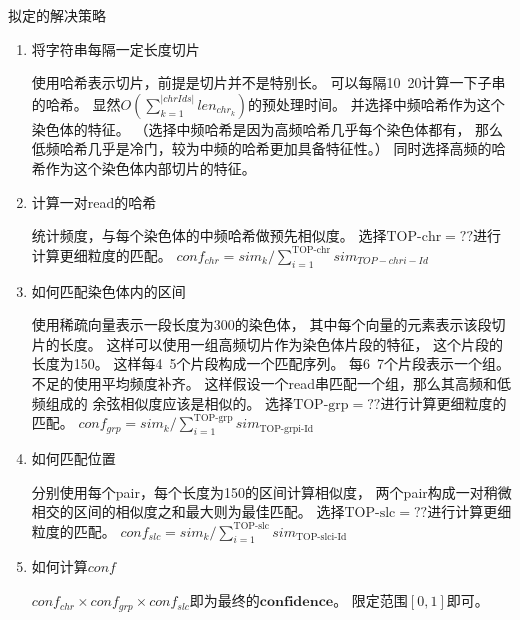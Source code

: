 \documentclass[hyperref,UTF8]{ctexart}
\theoremstyle{definition}
\theoremstyle{remark}
\numberwithin{equation}{subsection}
\newcommand{\Emph}{\textbf}
\begin{document}
	拟定的解决策略
	\begin{enumerate}
	
		\item 将字符串每隔一定长度切片
		
		使用哈希表示切片，前提是切片并不是特别长。
		可以每隔10~20计算一下子串的哈希。
		显然$O(\sum_{k=1}^{|chrIds|}{len_{chr_k}})$的预处理时间。
		并选择中频哈希作为这个染色体的特征。
		（选择中频哈希是因为高频哈希几乎每个染色体都有，
		那么低频哈希几乎是冷门，较为中频的哈希更加具备特征性。）
		同时选择高频的哈希作为这个染色体内部切片的特征。
		
		\item 计算一对read的哈希
		
		统计频度，与每个染色体的中频哈希做预先相似度。
		选择$\text{TOP-chr} = ??$进行计算更细粒度的匹配。
		$conf_{chr} = sim_k / \sum_{i=1}^{\text{TOP-chr}}{sim_{TOP-chri-Id}}$
		
		\item 如何匹配染色体内的区间
		
		使用稀疏向量表示一段长度为300的染色体，
		其中每个向量的元素表示该段切片的长度。
		这样可以使用一组高频切片作为染色体片段的特征，
		这个片段的长度为150。
		这样每4~5个片段构成一个匹配序列。
		每6~7个片段表示一个组。
		不足的使用平均频度补齐。
		这样假设一个read串匹配一个组，那么其高频和低频组成的
		余弦相似度应该是相似的。
        选择$\text{TOP-grp} = ??$进行计算更细粒度的匹配。
		$conf_{grp} = sim_k / \sum_{i=1}^{\text{TOP-grp}}{sim_\text{TOP-grpi-Id}}$
		
		\item 如何匹配位置
		
		分别使用每个pair，每个长度为150的区间计算相似度，
		两个pair构成一对稍微相交的区间的相似度之和最大则为最佳匹配。
		选择$\text{TOP-slc} = ??$进行计算更细粒度的匹配。
		$conf_{slc} = sim_k / \sum_{i=1}^{\text{TOP-slc}}{sim_\text{TOP-slci-Id}}$
		
		\item 如何计算$conf$
		
		$conf_{chr} \times conf_{grp} \times conf_{slc}$即为最终的$\Emph{confidence}$。
		限定范围$[0,1]$即可。
		
	\end{enumerate}
	
	
\end{document}
